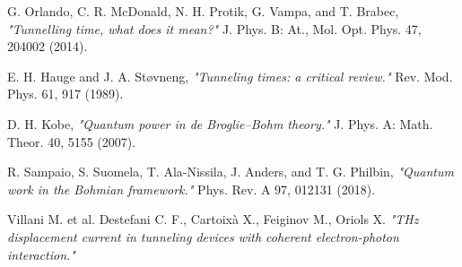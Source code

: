 \documentclass[11pt, a4paper]{article} %
\begin{document}
\begin{thebibliography}{1}
{
G. Orlando, C. R. McDonald, N. H. Protik, G. Vampa, and T. Brabec, {\em "Tunnelling time, what does it mean?"} J. Phys. B: At., Mol. Opt. Phys. 47, 204002 (2014).

E. H. Hauge and J. A. Støvneng, {\em "Tunneling times: a critical review."} Rev. Mod. Phys. 61, 917 (1989).

D. H. Kobe, {\em "Quantum power in de Broglie–Bohm theory."} J. Phys. A: Math. Theor. 40, 5155 (2007).

R. Sampaio, S. Suomela, T. Ala-Nissila, J. Anders, and T. G. Philbin, {\em "Quantum work in the Bohmian framework."} Phys. Rev. A 97, 012131 (2018).

Villani M. et al. Destefani C. F., Cartoixà X., Feiginov M., Oriols X. {\em "THz displacement current in tunneling devices with coherent electron-photon
interaction."}

}

\end{thebibliography}
\end{document}
